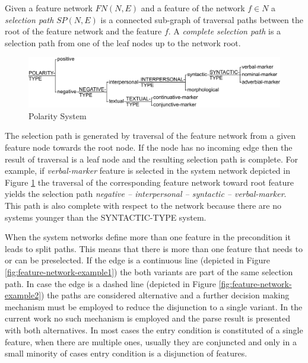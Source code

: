 
    Given a feature network $FN(N,E)$ and a feature of the network $f \in N$ a \textit{selection path} $SP(N,E)$ is a connected sub-graph of traversal paths between the root of the feature network and the feature $f$. A \textit{complete selection path} is a selection path from one of the leaf nodes up to the network root. 

    \begin{figure}[!ht]
        \centering
        \includegraphics[width=\textwidth]{Figures/SFL-grammar/polarity-system.pdf}
        \caption{Polarity System}
        \label{fig:polarity1}
    \end{figure}

    The selection path is generated by traversal of the feature network from a given feature node towards the root node. If the node has no incoming edge then the result of traversal is a leaf node and the resulting selection path is complete. For example, if \textit{verbal-marker} feature is selected in the system network depicted in Figure \ref{fig:polarity1} the traversal of the corresponding feature network toward root feature yields the selection path \textit{negative -- interpersonal -- syntactic -- verbal-marker}. This path is also complete with respect to the network because there are no systems younger than the SYNTACTIC-TYPE system.

    When the system networks define more than one feature in the precondition it leads to split paths. This means that there is more than one feature that needs to or can be preselected. If the edge is a continuous line (depicted  in Figure \ref{fig:feature-network-example1}) the both variants are part of the same selection path. In case the edge is a dashed line (depicted  in Figure \ref{fig:feature-network-example2}) the paths are considered alternative and a further decision making mechanism must be employed to reduce the disjunction to a single variant. In the current work no such mechanism is employed and the parse result is presented with both alternatives. In most cases the entry condition is constituted of a single feature, when there are multiple ones, usually they are conjuncted and only in a small minority of cases entry condition is a disjunction of features.

